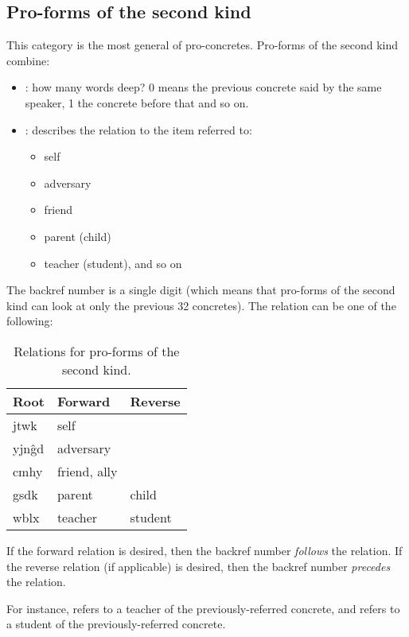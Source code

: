 \documentclass{book}
\begin{document}
\subsection{Pro-forms of the second kind}

This category is the most general of pro-concretes. Pro-forms of the second kind combine:

\begin{itemize}
  \item {}: how many words deep? 0 means the previous concrete said by the same speaker, 1 the concrete before that and so on.
  \item {}: describes the relation to the item referred to:
  \begin{itemize}
    \item self
    \item adversary
    \item friend
    \item parent (child)
    \item teacher (student), and so on
  \end{itemize}
\end{itemize}

The backref number is a single digit (which means that pro-forms of the second kind can look at only the previous 32 concretes). The relation can be one of the following:

\begin{table}[h]
  \caption{Relations for pro-forms of the second kind.}
  \centering
  \begin{tabular}{>{\kardinal}lll}
    \textnormal{Root} & Forward & Reverse \\
    \hline
    jtwk & self & \\
    yjn\^gd & adversary & \\
    cmhy & friend, ally & \\
    gsdk & parent & child \\
    wblx & teacher & student \\
  \end{tabular}
\end{table}

If the forward relation is desired, then the backref number \emph{follows} the relation. If the reverse relation (if applicable) is desired, then the backref number \emph{precedes} the relation.

For instance,  refers to a teacher of the previously-referred concrete, and  refers to a student of the previously-referred concrete.
\end{document}
